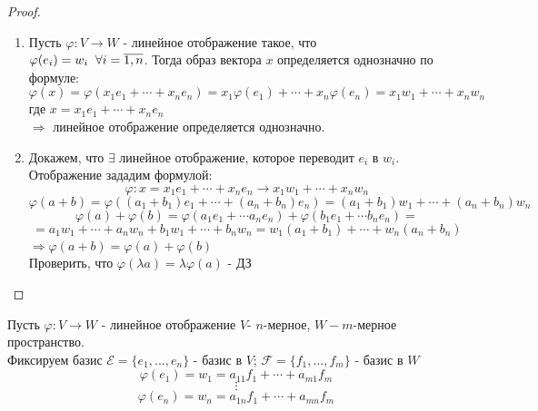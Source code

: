 \documentclass[a4paper, 12pt]{article}
\renewcommand{\phi}{\varphi}
\newcommand\tab[1][.5cm]{\hspace*{#1}}
\theoremstyle{definition}
\begin{document}
  \begin{proof} \tab
    \begin{enumerate}
      \item Пусть $\phi: V \to W$ - линейное отображение такое, что \\$\phi(e_i) = w_i \tab[0.2cm] \forall i = \overline{1,n}$. Тогда образ вектора $x$ определяется однозначно по формуле: $$\phi(x) = \phi(x_1e_1 + \cdots + x_ne_n) = x_1 \phi(e_1) + \cdots + x_n \phi(e_n) = x_1 w_1 + \cdots + x_n w_n$$ где $x=x_1e_1 + \cdots + x_ne_n$ \\
      $\Longrightarrow$ линейное отображение определяется однозначно.
      \item Докажем, что $\exists$ линейное отображение, которое переводит $e_i$ в $w_i$. Отображение зададим формулой: $$\phi: x = x_1e_1 + \cdots + x_ne_n \to x_1w_1 + \cdots + x_nw_n$$
      $$\phi(a+b) = \phi((a_1+b_1)e_1 + \cdots + (a_n + b_n)e_n) = (a_1+b_1)w_1 + \cdots + (a_n + b_n)w_n$$
      $$\phi(a) + \phi(b) = \phi(a_1e_1 + \cdots a_ne_n) + \phi(b_1e_1 + \cdots b_ne_n) = $$ $$= a_1w_1 + \cdots + a_nw_n + b_1w_1 + \cdots + b_nw_n = w_1(a_1 + b_1) + \cdots + w_n(a_n + b_n)$$
      $\Longrightarrow \phi(a+b) = \phi(a) + \phi(b)$\\
      Проверить, что $\phi(\lambda a) = \lambda \phi(a)$ - ДЗ
    \end{enumerate}
  \end{proof} 
  Пусть $\phi: V \to W$ - линейное отображение $V$- $n$-мерное, $W - m$-мерное пространство.  \\
  Фиксируем базис 
  $\mathcal{E}  = \{e_1,...,e_n\}$ - базис в $V$; $\mathcal{F}  = \{f_1,...,f_m\}$ - базис в $W$
  $$\phi(e_1) = w_1 = a_{11}f_1 + \cdots + a_{m1}f_m$$ $$\vdots$$
  $$\phi(e_n) = w_n = a_{1n}f_1 + \cdots + a_{mn}f_m$$
\end{document}
